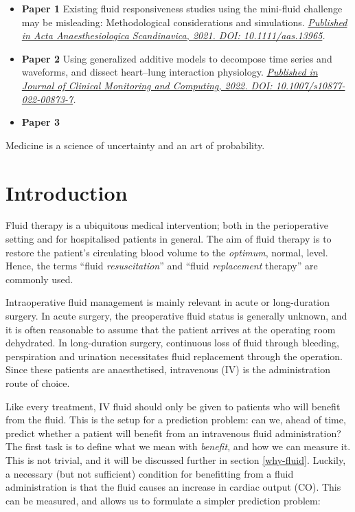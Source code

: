 \documentclass[a4paper, nobind]{templates/ociamthesis}
\providecommand{\tightlist}{%
  \setlength{\itemsep}{0pt}\setlength{\parskip}{0pt}}
\begin{document}
\begin{itemize}
\tightlist
\item
  \textbf{Paper 1} Existing fluid responsiveness studies using the mini-fluid challenge may be misleading: Methodological considerations and simulations.
  \emph{\href{https://doi.org/10.1111/aas.13965}{Published in Acta Anaesthesiologica Scandinavica, 2021. DOI: 10.1111/aas.13965}.}
\item
  \textbf{Paper 2} Using generalized additive models to decompose time series and waveforms, and dissect heart--lung interaction physiology.
  \emph{\href{http://https://doi.org/10.1007/s10877-022-00873-7}{Published in Journal of Clinical Monitoring and Computing, 2022. DOI: 10.1007/s10877-022-00873-7}.}
\item
  \textbf{Paper 3}
\end{itemize}

\begin{savequote}
Medicine is a science of uncertainty and an art of probability.
\end{savequote}



\hypertarget{introduction}{%
\chapter{Introduction}\label{introduction}}

Fluid therapy is a ubiquitous medical intervention; both in the perioperative setting and for hospitalised patients in general. The aim of fluid therapy is to restore the patient's circulating blood volume to the \emph{optimum}, normal, level. Hence, the terms ``fluid \emph{resuscitation}'' and ``fluid \emph{replacement} therapy'' are commonly used.

Intraoperative fluid management is mainly relevant in acute or long-duration surgery.
In acute surgery, the preoperative fluid status is generally unknown, and it is often reasonable to assume that the patient arrives at the operating room dehydrated.
In long-duration surgery, continuous loss of fluid through bleeding, perspiration and urination necessitates fluid replacement through the operation. Since these patients are anaesthetised, intravenous (IV) is the administration route of choice.

Like every treatment, IV fluid should only be given to patients who will benefit from the fluid.
This is the setup for a prediction problem: can we, ahead of time, predict whether a patient will benefit from an intravenous fluid administration?
The first task is to define what we mean with \emph{benefit}, and how we can measure it. This is not trivial, and it will be discussed further in section \ref{why-fluid}.
Luckily, a necessary (but not sufficient) condition for benefitting from a fluid administration is that the fluid causes an increase in cardiac output (CO).
This can be measured, and allows us to formulate a simpler prediction problem:
\end{document}
